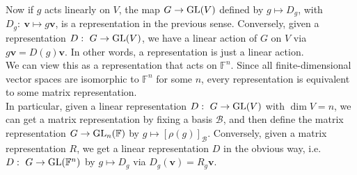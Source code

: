\documentclass[a4paper]{article}
\begin{document}
\begin{remarks}
Now if $g$ acts linearly on $V$, the map $G \to \operatorname{GL}(V)$ defined by $g \mapsto D_g$, with $D_g:~\mathbf{v} \mapsto g\mathbf{v}$, is a representation in the previous sense. Conversely, given a representation $D:~G \rightarrow \operatorname{GL}(V)$, we have a linear action of $G$ on $V$ via $g\mathbf{v} = D(g) \mathbf{v}$. In other words, a representation is just a linear action.\\[5pt]
We can view this as a representation that acts on $\mathbb{F}^n$. Since all finite-dimensional vector spaces are isomorphic to $\mathbb{F}^n$ for some $n$, every representation is equivalent to some matrix representation.\\[5pt]
In particular, given a linear representation $D:~G \rightarrow \operatorname{GL}(V)$ with $\dim V = n$, we can get a matrix representation by fixing a basis $\mathcal{B}$, and then define the matrix representation $G \rightarrow \operatorname{GL}_n(\mathbb{F})$ by $g \mapsto [\rho(g)]_{\mathcal{B}}$. Conversely, given a matrix representation $R$, we get a linear representation $D$ in the obvious way, i.e. $D:~G \rightarrow \operatorname{GL}(\mathbb{F}^n)$ by $g \mapsto D_g$ via $D_g(\mathbf{v}) = R_g \mathbf{v}$.
\end{remarks}
\end{document}
